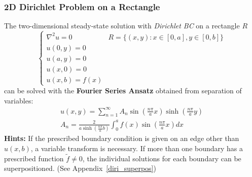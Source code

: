 \subsubsection{2D Dirichlet Problem on a Rectangle}\label{sssec:laplace_dir_rect}
The two-dimensional steady-state solution with \textit{Dirichlet BC} on a rectangle $R$
\begin{equation*}
    \begin{cases}
        \nabla^2 u=0 & R = \{(x,y) : x\in [0,a], y\in [0,b]\} \\
        u(0,y)=0                                              \\
        u(a,y)=0                                              \\
        u(x,0)=0                                              \\
        u(x,b)=f(x)
    \end{cases}
\end{equation*}
can be solved with the \textbf{Fourier Series Ansatz} obtained from separation of variables:
\begin{align*}
    u(x,y)=\sum_{n=1}^{\infty}A_{n}\sin(\frac{n\pi}ax)\sinh(\frac{n\pi}ay) \\
    A_{n}=\frac{2}{a\sinh(\frac{n\pi}{a}b)}\int^{a}_0f(x)\sin(\frac{n\pi}{a}x)dx
\end{align*}
\textbf{Hints:} If the prescribed boundary condition is given on an edge other than $u(x,b)$, a variable transform is necessary. If more than one boundary has a prescribed function $\widetilde{f}\neq0$, the
individual solutions for each boundary can be superpositioned. (See Appendix~\ref{diri_superpos})

